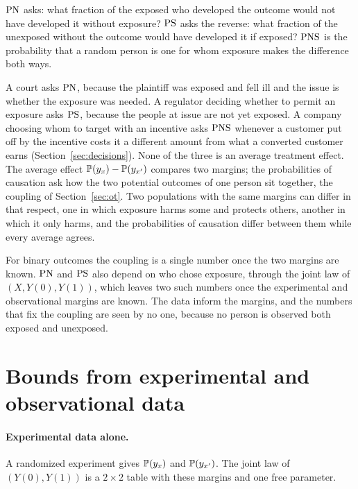 $\mathrm{PN}$ asks: what fraction of the exposed who developed the outcome would not have developed it without exposure? $\mathrm{PS}$ asks the reverse: what fraction of the unexposed without the outcome would have developed it if exposed? $\mathrm{PNS}$ is the probability that a random person is one for whom exposure makes the difference both ways.

A court asks $\mathrm{PN}$, because the plaintiff was exposed and fell ill and the issue is whether the exposure was needed. A regulator deciding whether to permit an exposure asks $\mathrm{PS}$, because the people at issue are not yet exposed. A company choosing whom to target with an incentive asks $\mathrm{PNS}$ whenever a customer put off by the incentive costs it a different amount from what a converted customer earns (Section~\ref{sec:decisions}). None of the three is an average treatment effect. The average effect $\mathbb{P}(y_x) - \mathbb{P}(y_{x'})$ compares two margins; the probabilities of causation ask how the two potential outcomes of one person sit together, the coupling of Section~\ref{sec:ot}. Two populations with the same margins can differ in that respect, one in which exposure harms some and protects others, another in which it only harms, and the probabilities of causation differ between them while every average agrees.

For binary outcomes the coupling is a single number once the two margins are known. $\mathrm{PN}$ and $\mathrm{PS}$ also depend on who chose exposure, through the joint law of $(X, Y(0), Y(1))$, which leaves two such numbers once the experimental and observational margins are known. The data inform the margins, and the numbers that fix the coupling are seen by no one, because no person is observed both exposed and unexposed.

\section{Bounds from experimental and observational data}

\paragraph{Experimental data alone.} A randomized experiment gives $\mathbb{P}(y_x)$ and $\mathbb{P}(y_{x'})$. The joint law of $(Y(0), Y(1))$ is a $2 \times 2$ table with these margins and one free parameter.

